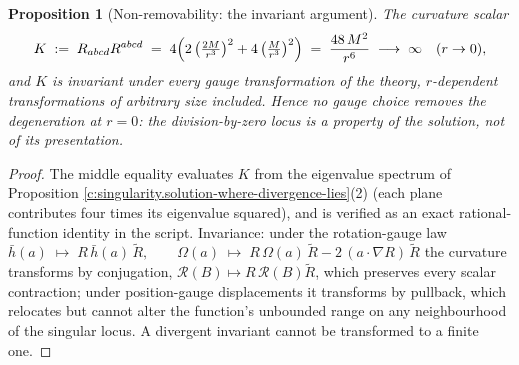 \documentclass[11pt]{article}
\newtheorem{proposition}[theorem]{Proposition}
\theoremstyle{definition}
\theoremstyle{plain}
\providecommand{\hb}{}\renewcommand{\hb}{\bar{h}}
\begin{document}
\begin{proposition}[Non-removability: the invariant argument]\label{c:singularity.non-removability-invariant-argument}
The curvature scalar
\[
K \;:=\; R_{abcd}R^{abcd} \;=\; 4\Bigl(2\,\bigl(\tfrac{2M}{r^3}\bigr)^2 + 4\,\bigl(\tfrac{M}{r^3}\bigr)^2\Bigr) \;=\; \frac{48\,M^2}{r^6}
\;\longrightarrow\; \infty \quad (r \to 0),
\]
and $K$ is invariant under every gauge transformation of the theory, $r$-dependent transformations of arbitrary size included. Hence no gauge choice removes the degeneration at $r = 0$: the division-by-zero locus is a property of the solution, not of its presentation.
\end{proposition}
\begin{proof}
The middle equality evaluates $K$ from the eigenvalue spectrum of Proposition \ref{c:singularity.solution-where-divergence-lies}(2) (each plane contributes four times its eigenvalue squared), and is verified as an exact rational-function identity in the script. Invariance: under the rotation-gauge law $\hb(a) \;\mapsto\; R\,\hb(a)\,\tilde R, \qquad \Omega(a) \;\mapsto\; R\,\Omega(a)\,\tilde R - 2\,(a\cdot\nabla R)\,\tilde R$ the curvature transforms by conjugation, $\mathcal{R}(B) \mapsto R\,\mathcal{R}(B)\tilde R$, which preserves every scalar contraction; under position-gauge displacements it transforms by pullback, which relocates but cannot alter the function's unbounded range on any neighbourhood of the singular locus. A divergent invariant cannot be transformed to a finite one.

\end{proof}
\end{document}
